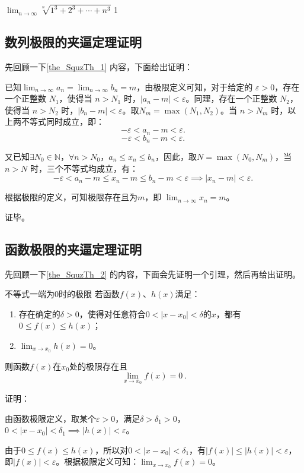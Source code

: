 \begin{example}{$\lim_{n\to\infty}\sqrt[n]{1^3+2^3+\cdots+n^3}$}
1
\end{example}
\subsection{数列极限的夹逼定理证明}

先回顾一下\autoref{the_SquzTh_1} 内容，下面给出证明：

已知$\lim_{n \to \infty} a_n = \lim_{n \to \infty} b_n = m$，由极限定义可知，对于给定的 $\varepsilon > 0$，存在一个正整数 $N_1$，使得当 $n > N_1$ 时，$|a_n - m| < \varepsilon$。同理，存在一个正整数 $N_2$，使得当 $n > N_2$ 时，$|b_n - m| < \varepsilon$。取$N_m = \max(N_1, N_2)$。当 $n > N_m$ 时，以上两不等式同时成立，即：
\begin{equation}
- \varepsilon < a_n-m <\varepsilon.~
\end{equation}
\begin{equation}
-\varepsilon < b_n-m <\varepsilon.~
\end{equation}

又已知$\exists N_0\in \mathbb{N}$，$\forall n>N_0$，$a_n\leq x_n\leq b_n$，因此，取$N=\max(N_0, N_m)$，当 $n > N$ 时，三个不等式均成立，有：
\begin{equation}
- \varepsilon < a_n-m \leq x_n-m \leq b_n-m <\varepsilon\implies |x_n-m|<\varepsilon.~
\end{equation}

根据极限的定义，可知极限存在且为$m$，即 $\lim_{n \to \infty} x_n = m$。

证毕。


\subsection{函数极限的夹逼定理证明}


先回顾一下\autoref{the_SquzTh_2} 的内容，下面会先证明一个引理，然后再给出证明。

\begin{lemma}{不等式一端为0时的极限}\label{lem_SquzTh_1}
若函数$f(x)$、$h(x)$满足：
\begin{enumerate}
\item 存在确定的$\delta>0$，使得对任意符合$0<|x-x_0|<\delta$的$x$，都有$0\leq f(x)\leq h(x)$；
\item $\lim _{x\to x_0}h(x)=0$。
\end{enumerate}
则函数$f(x)$在$x_0$处的极限存在且
\begin{equation}
\lim _{x\to x_0}f(x)=0~.
\end{equation}

证明：

由函数极限定义，取某个$\varepsilon>0$，满足$\delta>\delta_1>0$，$0<|x-x_0|<\delta_1\implies|h(x)|<\varepsilon$。

由于$0\leq f(x)\leq h(x)$，所以对$0<|x-x_0|<\delta_1$，有$|f(x)|\leq |h(x)|<\varepsilon$，即$|f(x)|<\varepsilon$。根据极限定义可知：$\lim _{x\to x_0}f(x)=0$。

\end{lemma}

